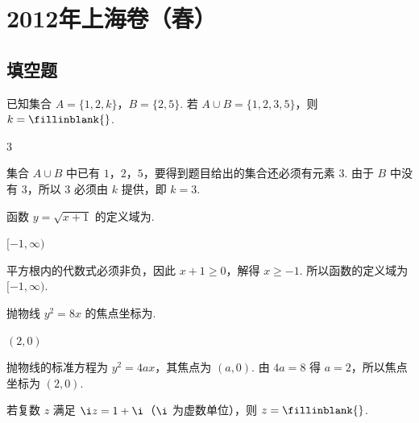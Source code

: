 \chapter{2012年上海卷（春）}

\section{填空题}

\begin{problem}
已知集合 \(A=\{1,2,k\}\)，\(B=\{2,5\}\). 若 \(A\cup B=\{1,2,3,5\}\)，则 \(k=\fillinblank{}\).
\end{problem}

\begin{answer}
\(3\)
\end{answer}

\begin{solution}
集合 \(A\cup B\) 中已有 \(1\)，\(2\)，\(5\)，要得到题目给出的集合还必须有元素 \(3\). 由于 \(B\) 中没有 \(3\)，所以 \(3\) 必须由 \(k\) 提供，即 \(k=3\).
\end{solution}

\begin{problem}
函数 \(y=\sqrt{x+1}\) 的定义域为\fillinblank{}.
\end{problem}

\begin{answer}
\([-1,\infty)\)
\end{answer}

\begin{solution}
平方根内的代数式必须非负，因此 \(x+1\ge0\)，解得 \(x\ge-1\). 所以函数的定义域为 \([-1,\infty)\).
\end{solution}

\begin{problem}
抛物线 \(y^2=8x\) 的焦点坐标为\fillinblank{}.
\end{problem}

\begin{answer}
\((2,0)\)
\end{answer}

\begin{solution}
抛物线的标准方程为 \(y^2=4ax\)，其焦点为 \((a,0)\). 由 \(4a=8\) 得 \(a=2\)，所以焦点坐标为 \((2,0)\).
\end{solution}

\begin{problem}
若复数 \(z\) 满足 \(\i z=1+\i\)（\(\i\) 为虚数单位），则 \(z=\fillinblank{}\).
\end{problem}

